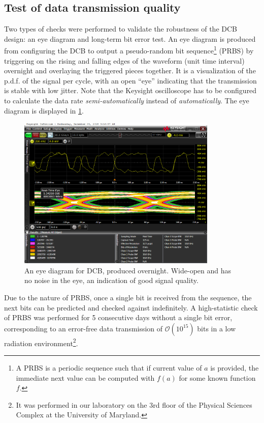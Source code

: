 \subsection{Test of data transmission quality}
\label{dcb-test-data}

Two types of checks were performed to validate the robustness of the DCB design:
an eye diagram and long-term bit error test.
An eye diagram is produced from configuring the DCB to output a pseudo-random
bit sequence\footnote{
    A PRBS is a periodic sequence such that if current value of $a$ is provided,
    the immediate next value can be computed with $f(a)$ for some known function
    $f$.
} (PRBS) by triggering on the rising and falling edges
of the waveform (unit time interval) overnight and overlaying the triggered
pieces together.
It is a visualization of the p.d.f. of the signal per cycle,
with an open ``eye'' indicating that the transmission is stable with low jitter.
Note that the Keysight oscilloscope has to be configured to calculate the
data rate \emph{semi-automatically} instead of \emph{automatically}.
The eye diagram is displayed in \cref{fig:dcb-eye}.

\begin{figure}[!htb]
    \centering
    \includegraphics[width=0.85\textwidth]{./figs-ut-upgrade/dcb/dcb_eye_diagram.png}
    \caption{
        An eye diagram for DCB, produced overnight.
        Wide-open and has no noise in the eye, an indication of good signal
        quality.
    }
    \label{fig:dcb-eye}
\end{figure}

Due to the nature of PRBS, once a single bit is received from the sequence,
the next bits can be predicted and checked against indefinitely.
A high-statistic check of PRBS was performed for 5 consecutive days without
a single bit error, corresponding to an error-free data transmission of
$\mathcal{O}(10^{15})$ bits in a low radiation environment\footnote{
    It was performed in our laboratory on the 3rd floor of the Physical
    Sciences Complex at the University of Maryland.
}.


